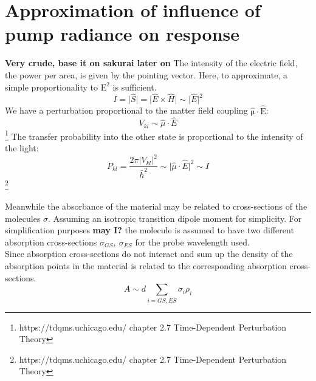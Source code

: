 \documentclass[twoside,openright]{scrreprt}
\begin{document}
\section{Approximation of influence of pump radiance on response}\label{deriv:RadianceResponse}
\textbf{Very crude, base it on sakurai later on}
The intensity of the electric field, the power per area, is given by the pointing vector. Here, to approximate, a simple proportionality to  $\mathrm{E^2}$ is sufficient.
\begin{equation*}
I =  \lvert  \hat{S} \rvert =  \lvert \hat{E} \times \hat{H} \rvert  \sim \lvert \hat{E} \rvert^2
\end{equation*}
We have a perturbation proportional to the matter field coupling $\mathrm{\hat{\mu}\cdot \hat{E}}$:
\begin{equation}
V_{kl} \sim \hat{\mu}\cdot\hat{E}
\end{equation}\footnote{https://tdqms.uchicago.edu/ chapter 2.7 Time-Dependent Perturbation Theory}
The transfer probability into the other state is proportional to the intensity of the light:
\begin{equation*}
P_{kl} = \frac{2\pi \lvert V_{kl}\rvert^2}{\bar{h}^2} \sim \lvert \hat{\mu}\cdot\hat{E}\rvert^2 \sim I
\end{equation*}\footnote{https://tdqms.uchicago.edu/ chapter 2.7 Time-Dependent Perturbation Theory}

Meanwhile the absorbance of the material may be related to  cross-sections of the molecules $\sigma$. Assuming an isotropic transition dipole moment for simplicity. For simplification purposes \textbf{may I?} the molecule is assumed to have two different absorption cross-sections $\sigma_{GS},\ \sigma_{ES}$ for the probe wavelength used.\\
Since absorption cross-sections do not interact and sum up the density of the absorption points in the material is related to the corresponding absorption cross-sections.
\begin{equation}
A \sim d \sum_{i=GS, ES} \sigma_{i} \rho_i
\end{equation}
\end{document}
